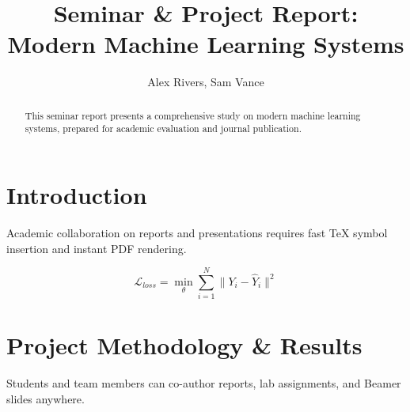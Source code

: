\documentclass[12pt]{article}
\title{Seminar \& Project Report: Modern Machine Learning Systems}
\author{Alex Rivers, Sam Vance}
\date{}
\begin{document}
\maketitle

\begin{abstract}
This seminar report presents a comprehensive study on modern machine learning systems, prepared for academic evaluation and journal publication.
\end{abstract}

\section{Introduction}
Academic collaboration on reports and presentations requires fast TeX symbol insertion and instant PDF rendering.

\begin{equation}
\mathcal{L}_{loss} = \min_{\theta} \sum_{i=1}^{N} \| Y_i - \hat{Y}_i \|^2
\end{equation}

\section{Project Methodology \& Results}
Students and team members can co-author reports, lab assignments, and Beamer slides anywhere.
\end{document}
